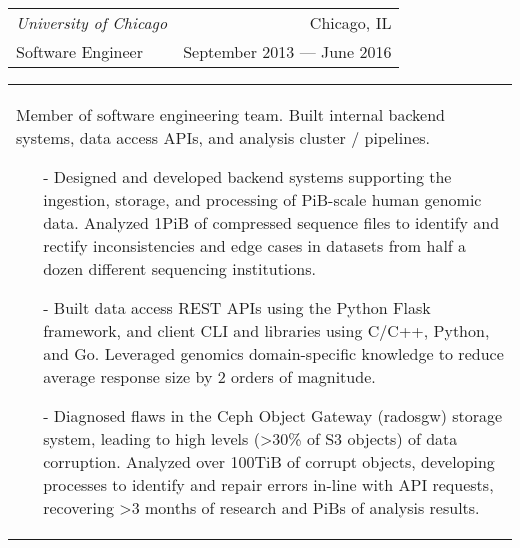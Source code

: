 \begin{tabularx}{\textwidth}{L R}
    \normalsize\textit{University of Chicago} & Chicago, IL \\
    \hspace{10pt}Software Engineer & September 2013 --- June 2016 \\
\end{tabularx}
\begin{tabularx}{\textwidth}{X}
    \vspace{1pt}
    Member of software engineering team. Built internal backend systems, data access APIs, and analysis cluster / pipelines.
    \begin{itemize}
        \itemsep{}
        \item[-] Designed and developed backend systems supporting the ingestion, storage, and processing of PiB-scale human genomic data. Analyzed 1PiB of compressed sequence files to identify and rectify inconsistencies and edge cases in datasets from half a dozen different sequencing institutions.
        \item[-] Built data access REST APIs using the Python Flask framework, and client CLI and libraries using C/C++, Python, and Go. Leveraged genomics domain-specific knowledge to reduce average response size by 2 orders of magnitude.
        \item[-] Diagnosed flaws in the Ceph Object Gateway (radosgw) storage system, leading to high levels (>30\% of S3 objects) of data corruption. Analyzed over 100TiB of corrupt objects, developing processes to identify and repair errors in-line with API requests, recovering >3 months of research and PiBs of analysis results.
    \end{itemize}
\end{tabularx}
